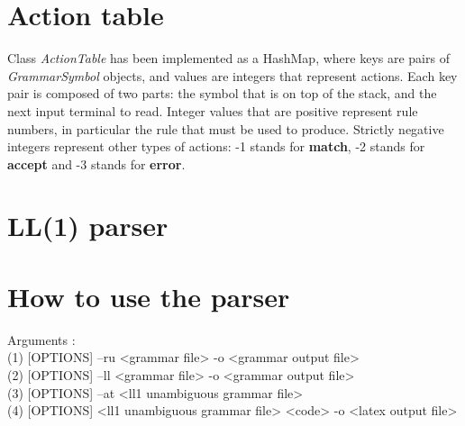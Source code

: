 \section{Action table}

Class \textit{ActionTable} has been implemented as a HashMap, where keys are pairs of \textit{GrammarSymbol} objects, and values are integers
that represent actions. Each key pair is composed of two parts: the symbol that is on top of the stack, and the next input terminal to read.
Integer values that are positive represent rule numbers, in particular the rule that must be used to produce. Strictly negative integers
represent other types of actions: -1 stands for \textbf{match}, -2 stands for \textbf{accept} and -3 stands for \textbf{error}.

\section{LL(1) parser}

\section{How to use the parser}

Arguments : \\
\indent (1) [OPTIONS] --ru <grammar file> -o <grammar output file> \\
\indent (2) [OPTIONS] --ll <grammar file> -o <grammar output file> \\
\indent (3) [OPTIONS] --at <ll1 unambiguous grammar file> \\
\indent (4) [OPTIONS] <ll1 unambiguous grammar file> <code> -o <latex output file>